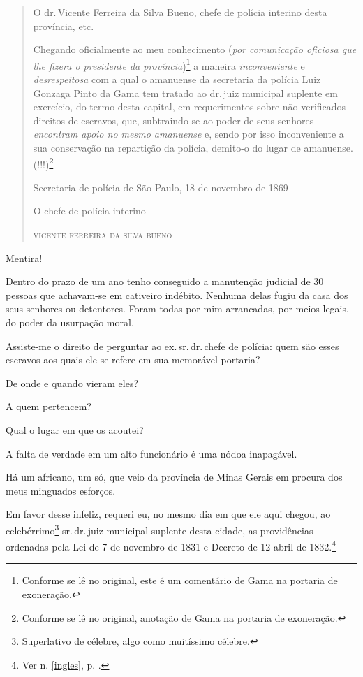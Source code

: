 \begin{quote}
O dr.\,Vicente Ferreira da Silva Bueno, chefe de polícia interino desta
província, etc.

Chegando oficialmente ao meu conhecimento (\emph{por comunicação
oficiosa que lhe fizera o presidente da província})\footnote{Conforme
  se lê no original, este é um comentário de Gama na portaria de
  exoneração.} a maneira \emph{inconveniente} e \emph{desrespeitosa} com
a qual o amanuense da secretaria da polícia Luiz Gonzaga Pinto da Gama
tem tratado ao dr.\,juiz municipal suplente em exercício, do termo desta
capital, em requerimentos sobre não verificados direitos de escravos,
que, subtraindo-se ao poder de seus senhores \emph{encontram apoio no
mesmo amanuense} e, sendo por isso inconveniente a sua conservação na
repartição da polícia, demito-o do lugar de amanuense. (!!!)\footnote{
  Conforme se lê no original, anotação de Gama na portaria de exoneração.}

\begin{flushright}
Secretaria de polícia de São Paulo, 18 de novembro de 1869

O chefe de polícia interino

\textsc{vicente ferreira da silva bueno}
\end{flushright}
\end{quote}

Mentira!

Dentro do prazo de um ano tenho conseguido a manutenção judicial de 30
pessoas que achavam-se em cativeiro indébito. Nenhuma delas fugiu da
casa dos seus senhores ou detentores. Foram todas por mim arrancadas,
por meios legais, do poder da usurpação moral.

Assiste-me o direito de perguntar ao ex.\,sr.\,dr.\,chefe de polícia: quem
são esses escravos aos quais ele se refere em sua memorável portaria?

De onde e quando vieram eles?

A quem pertencem?

Qual o lugar em que os acoutei?

A falta de verdade em um alto funcionário é uma nódoa inapagável.

Há um africano, um só, que veio da província de Minas Gerais em procura
dos meus minguados esforços.

Em favor desse infeliz, requeri eu, no mesmo dia em que ele aqui chegou,
ao celebérrimo\footnote{Superlativo de célebre, algo como muitíssimo
  célebre.} sr.\,dr.\,juiz municipal suplente desta cidade, as
providências ordenadas pela Lei de 7 de novembro de 1831 e Decreto de 12
abril de 1832.\footnote{Ver n. \ref{ingles}, p. \pageref{ingles}.}


